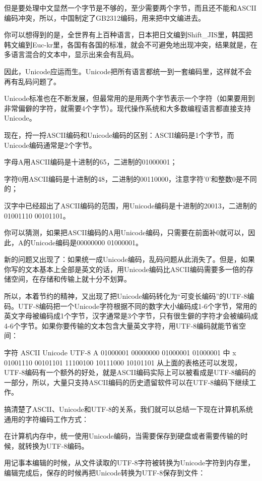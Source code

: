 \documentclass[10pt,a4paper]{ctexbook}
\begin{document}
但是要处理中文显然一个字节是不够的，至少需要两个字节，而且还不能和ASCII编码冲突，所以，中国制定了GB2312编码，用来把中文编进去。

你可以想得到的是，全世界有上百种语言，日本把日文编到Shift\_JIS里，韩国把韩文编到Euc-kr里，各国有各国的标准，就会不可避免地出现冲突，结果就是，在多语言混合的文本中，显示出来会有乱码。

因此，Unicode应运而生。Unicode把所有语言都统一到一套编码里，这样就不会再有乱码问题了。

Unicode标准也在不断发展，但最常用的是用两个字节表示一个字符（如果要用到非常偏僻的字符，就需要4个字节）。现代操作系统和大多数编程语言都直接支持Unicode。

现在，捋一捋ASCII编码和Unicode编码的区别：ASCII编码是1个字节，而Unicode编码通常是2个字节。

字母A用ASCII编码是十进制的65，二进制的01000001；

字符0用ASCII编码是十进制的48，二进制的00110000，注意字符'0'和整数0是不同的；

汉字中已经超出了ASCII编码的范围，用Unicode编码是十进制的20013，二进制的01001110 00101101。

你可以猜测，如果把ASCII编码的A用Unicode编码，只需要在前面补0就可以，因此，A的Unicode编码是00000000 01000001。

新的问题又出现了：如果统一成Unicode编码，乱码问题从此消失了。但是，如果你写的文本基本上全部是英文的话，用Unicode编码比ASCII编码需要多一倍的存储空间，在存储和传输上就十分不划算。

所以，本着节约的精神，又出现了把Unicode编码转化为“可变长编码”的UTF-8编码。UTF-8编码把一个Unicode字符根据不同的数字大小编码成1-6个字节，常用的英文字母被编码成1个字节，汉字通常是3个字节，只有很生僻的字符才会被编码成4-6个字节。如果你要传输的文本包含大量英文字符，用UTF-8编码就能节省空间：

字符	ASCII	Unicode	UTF-8
A	01000001	00000000 01000001	01000001
中	x	01001110 00101101	11100100 10111000 10101101
从上面的表格还可以发现，UTF-8编码有一个额外的好处，就是ASCII编码实际上可以被看成是UTF-8编码的一部分，所以，大量只支持ASCII编码的历史遗留软件可以在UTF-8编码下继续工作。

搞清楚了ASCII、Unicode和UTF-8的关系，我们就可以总结一下现在计算机系统通用的字符编码工作方式：

在计算机内存中，统一使用Unicode编码，当需要保存到硬盘或者需要传输的时候，就转换为UTF-8编码。

用记事本编辑的时候，从文件读取的UTF-8字符被转换为Unicode字符到内存里，编辑完成后，保存的时候再把Unicode转换为UTF-8保存到文件：
\end{document}
